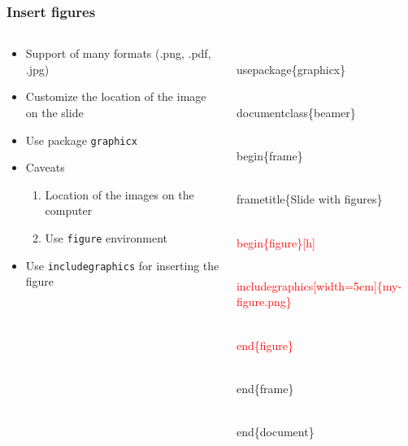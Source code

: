 \documentclass[10pt]{beamer}
\newcommand{\code}{\textcolor{red}}
\begin{document}
\begin{frame}
  \frametitle{Insert figures}

  \begin{columns}
       
       
 \begin{column}{0.5\textwidth}
   \begin{itemize}
   \item Support of many formats (.png, .pdf, .jpg)
   \item Customize the location of the image on the slide
   \item Use package \texttt{graphicx}
   \item Caveats
  

       \begin{enumerate}
         
         \item Location of the images on the computer
         \item Use \texttt{figure} environment


       \end{enumerate}
       
  
  \item Use \texttt{includegraphics} for inserting the figure
  
  \end{itemize}    
      
 \end{column}
 
\begin{column}{0.6\textwidth}
   
   
 \begin{semiverbatim}
 
 \\usepackage\{graphicx\}
   
\\documentclass\{beamer\}

\\begin\{frame\}

\\frametitle\{Slide with figures\}
 
\code{\\begin\{figure\}[h]}
 
 \code{\\includegraphics[width=5cm]\{my-figure.png\}}

\code{\\end\{figure\}}

\\end\{frame\}

\\end\{document\}
  
\end{semiverbatim}

 \end{column}
 

       \end{columns}


\end{frame}
\end{document}
